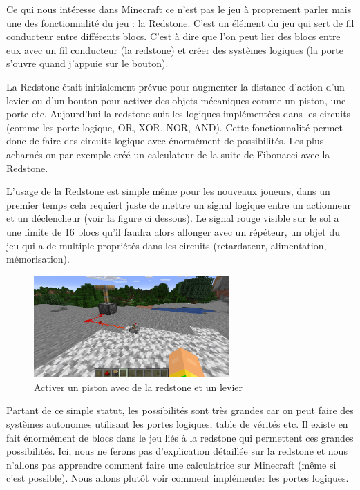 Ce qui nous intéresse dans Minecraft ce n'est pas le jeu à proprement parler mais une des fonctionnalité du jeu : la Redstone. C'est un élément du jeu qui sert de fil conducteur entre différents blocs. C'est à dire que l'on peut lier des blocs entre eux avec un fil conducteur (la redstone) et créer des systèmes logiques (la porte s'ouvre quand j'appuie sur le bouton).

La Redstone était initialement prévue pour augmenter la distance d'action d'un levier ou d'un bouton pour activer des objets mécaniques comme un piston, une porte etc. Aujourd'hui la redstone suit les logiques implémentées dans les circuits (comme les porte logique, OR, XOR, NOR, AND). Cette fonctionnalité permet donc de faire des circuits logique avec énormément de possibilités. Les plus acharnés on par exemple créé un calculateur de la suite de Fibonacci avec la Redstone. \cite{58} 

L'usage de la Redstone est simple même pour les nouveaux joueurs, dans un premier temps cela requiert juste de mettre un signal logique entre un actionneur et un déclencheur (voir la figure ci dessous). Le signal rouge visible sur le sol a une limite de 16 blocs qu'il faudra alors allonger avec un répéteur, un objet du jeu qui a de multiple propriétés dans les circuits (retardateur, alimentation, mémorisation).

\begin{figure}[!htb]
  \centering
  \includegraphics[width=75mm,scale=0.5]{images/minecraft.png}
  \caption{Activer un piston avec de la redstone et un levier}
  \label{fig:boat1}
\end{figure}

Partant de ce simple statut, les possibilités sont très grandes car on peut faire des systèmes autonomes utilisant les portes logiques, table de vérités etc. Il existe en fait énormément de blocs dans le jeu liés à la redstone qui permettent ces grandes possibilités. \cite{59} Ici, nous ne ferons pas d'explication détaillée sur la redstone et nous n'allons pas apprendre comment faire une calculatrice sur Minecraft (même si c'est possible). Nous allons plutôt voir comment implémenter les portes logiques.

